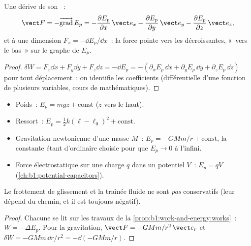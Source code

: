 \begin{proposition}\label{prop:b1:work-and-energy:gradient}
Une  dérive de son ~:
\[
\vect F = -\overrightarrow{\operatorname{grad}}\,E_p
= -\frac{\partial E_p}{\partial x}\,\vect e_x
- \frac{\partial E_p}{\partial y}\,\vect e_y
- \frac{\partial E_p}{\partial z}\,\vect e_z ,
\]
et à une dimension $F_x = -\dd E_p/\dd x$~: la force pointe vers les
 décroissantes, «~vers le bas~» sur le graphe de $E_p$.
\end{proposition}

\begin{proof}
$\delta W = F_x\dd x + F_y\dd y + F_z\dd z = -\dd E_p = -(\partial_xE_p\,\dd x
+ \partial_yE_p\,\dd y + \partial_zE_p\,\dd z)$ pour tout déplacement~:
on identifie les coefficients (différentielle d'une fonction de
plusieurs variables, cours de mathématiques).
\end{proof}

\begin{proposition}\label{prop:b1:work-and-energy:eps}
\begin{itemize}
  \item Poids~: $E_p = mgz + \text{const}$ ($z$ vers le haut).
  \item Ressort~: $E_p = \tfrac12 k(\ell - \ell_0)^2 + \text{const}$.
  \item Gravitation newtonienne d'une masse $M$~: $E_p = -GMm/r + \text{const}$,
        la constante étant d'ordinaire choisie pour que $E_p \to 0$ à l'infini.
  \item Force électrostatique sur une charge $q$ dans un potentiel $V$~:
        $E_p = qV$ (\cref{ch:b1:potential-capacitors}).
\end{itemize}
Le frottement de glissement et la traînée fluide ne sont \emph{pas}
conservatifs (leur  dépend du chemin, et il est toujours négatif).
\end{proposition}

\begin{proof}
Chacune se lit sur les travaux de la
\cref{prop:b1:work-and-energy:works}~: $W = -\Delta E_p$. Pour la
gravitation, $\vect F = -GMm/r^2\,\vect e_r$ et
$\delta W = -GMm\,\dd r/r^2 = -\dd(-GMm/r)$.
\end{proof}

